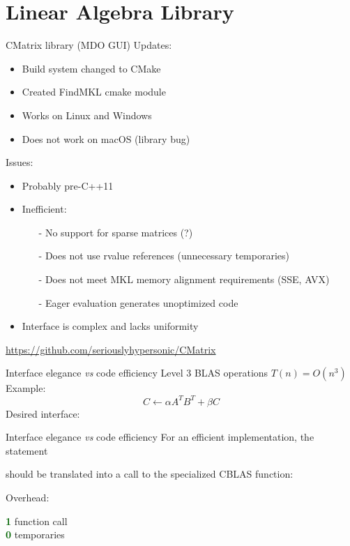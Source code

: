 \documentclass{beamer}
\newcommand{\linkstyle}[1]{\textcolor{cyan}{\underline{#1}}}
\begin{document}
\section{Linear Algebra Library}
\begin{frame}{CMatrix library (MDO GUI)}
Updates:
\begin{itemize}
	\item Build system changed to CMake
	\item Created FindMKL cmake module
	\item Works on Linux and Windows
	\item Does not work on macOS (library bug)
\end{itemize}

Issues:
\begin{itemize}
	\item Probably pre-C++11
	\item Inefficient:
	\begin{itemize}
		\item[-] No support for sparse matrices (?)
		\item[-] Does not use rvalue references (unnecessary temporaries)
		\item[-] Does not meet MKL memory alignment requirements (SSE, AVX)
		\item[-] Eager evaluation generates unoptimized code
	\end{itemize}
	\item Interface is complex and lacks uniformity
\end{itemize}
	\begin{center}
		\scriptsize
		\linkstyle{\url{https://github.com/seriouslyhypersonic/CMatrix}}
	\end{center}
\end{frame}

\begin{frame}[fragile]{Interface elegance \textit{vs} code efficiency}
	Level 3 BLAS operations $T(n) = O(n^3)$\\
	Example:
	\begin{equation}
		C \leftarrow \alpha A^T B^T + \beta C
	\end{equation}
	Desired interface:
	
\end{frame}

\begin{frame}[fragile]{Interface elegance \textit{vs} code efficiency}
	For an efficient implementation, the statement
	
	should be translated into a call to the specialized CBLAS function:
	
	Overhead: \\
	\begin{center}
		\textcolor{DarkGreen}{\textbf{1}} function call\\
		\textcolor{DarkGreen}{\textbf{0}} temporaries
	\end{center}
\end{frame}
\end{document}
